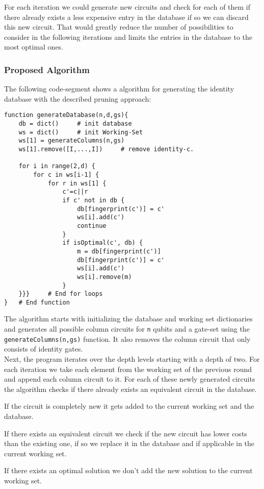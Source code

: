 For each iteration we could generate new circuits and check for each of them if there already exists a less expensive entry in the database if so we can discard this new circuit. That would greatly reduce the number of possibilities to consider in the following iterations and limits the entries in the database to the most optimal ones.

\subsubsection{Proposed Algorithm}

The following code-segment shows a algorithm for generating the identity database with the described pruning approach:
\begin{verbatim}
function generateDatabase(n,d,gs){
	db = dict() 	# init database
	ws = dict() 	# init Working-Set
	ws[1] = generateColumns(n,gs)
	ws[1].remove([I,...,I]) 	# remove identity-c.
	
	for i in range(2,d) {
		for c in ws[i-1] {
			for r in ws[1] {
				c'=c||r
				if c' not in db {
					db[fingerprint(c')] = c'
					ws[i].add(c')
					continue
				}
				if isOptimal(c', db) {
					m = db[fingerprint(c')]
					db[fingerprint(c')] = c'	
					ws[i].add(c')
					ws[i].remove(m)
				}
	}}} 	# End for loops
} 	# End function
\end{verbatim}

The algorithm starts with initializing the database and working set dictionaries and generates all possible column circuits for \texttt{n} qubits and a gate-set using the \texttt{generateColumns(n,gs)} function. It also removes the column circuit that only consists of identity gates.\\

Next, the program iterates over the depth levels starting with a depth of two. For each iteration we take each element from the working set of the previous round and append each column circuit to it. For each of these newly generated circuits the algorithm checks if there already exists an equivalent circuit in the database. 

If the circuit is completely new it gets added to the current working set and the database. 

If there exists an equivalent circuit we check if the new circuit has lower costs than the existing one, if so we replace it in the database and if applicable in the current working set. 

If there exists an optimal solution we don't add the new solution to the current working set.

